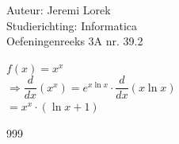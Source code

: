 \documentclass[a4paper]{article}
\begin{document}
  
\noindent \large Auteur: Jeremi Lorek\\
\noindent \large Studierichting: Informatica\\
\noindent \large Oefeningenreeks 3A nr. 39.2\\

\medskip
\normalsize

$f(x) = x^x$  \\

$\Rightarrow \dfrac{d}{dx} \left( x^x \right) = e^{x \ln x} \cdot \dfrac{d}{dx} \left( x \ln x \right)$  \\

$= x^x \cdot (\ln x + 1)$  \\

\begin{thebibliography}{999}
\end{thebibliography}
\end{document}
